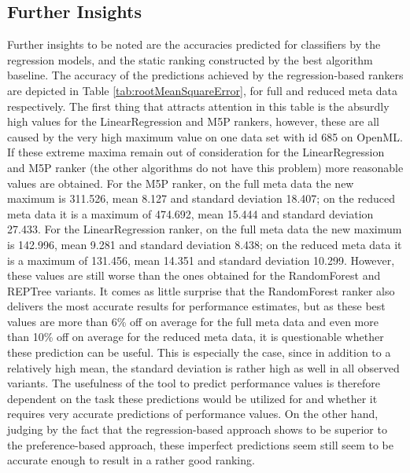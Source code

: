

\subsection{Further Insights}

Further insights to be noted are the accuracies predicted for classifiers by the regression models, and the static ranking constructed by the best algorithm baseline. The accuracy of the predictions achieved by the regression-based rankers are depicted in Table \ref{tab:rootMeanSquareError}, for full and reduced meta data respectively. The first thing that attracts attention in this table is the absurdly high values for the LinearRegression and M5P rankers, however, these are all caused by the very high maximum value on one data set with id 685 on OpenML. If these extreme maxima remain out of consideration for the LinearRegression and M5P ranker (the other algorithms do not have this problem) more reasonable values are obtained. For the M5P ranker, on the full meta data the new maximum is 311.526, mean 8.127 and standard deviation 18.407; on the reduced meta data it is a maximum of 474.692, mean 15.444 and standard deviation 27.433. For the LinearRegression ranker, on the full meta data the new maximum is 142.996, mean 9.281 and standard deviation 8.438; on the reduced meta data it is a maximum of 131.456, mean 14.351 and standard deviation 10.299. However, these values are still worse than the ones obtained for the RandomForest and REPTree variants. It comes as little surprise that the RandomForest ranker also delivers the most accurate results for performance estimates, but as these best values are more than 6\% off on average for the full meta data and even more than 10\% off on average for the reduced meta data, it is questionable whether these prediction can be useful. This is especially the case, since in addition to a relatively high mean, the standard deviation is rather high as well in all observed variants. The usefulness of the tool to predict performance values is therefore dependent on the task these predictions would be utilized for and whether it requires very accurate predictions of performance values. On the other hand, judging by the fact that the regression-based approach shows to be superior to the preference-based approach, these imperfect predictions seem still seem to be accurate enough to result in a rather good ranking.




